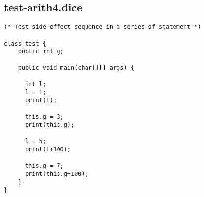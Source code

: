 \subsection{test-arith4.dice}
\begin{verbatim}
(* Test side-effect sequence in a series of statement *)

class test {
	public int g;

	public void main(char[][] args) {

	  int l;
	  l = 1;
	  print(l);
	  
	  this.g = 3;
	  print(this.g);
	  
	  l = 5;
	  print(l+100);
	  
	  this.g = 7;
	  print(this.g+100);
	}
}
\end{verbatim}